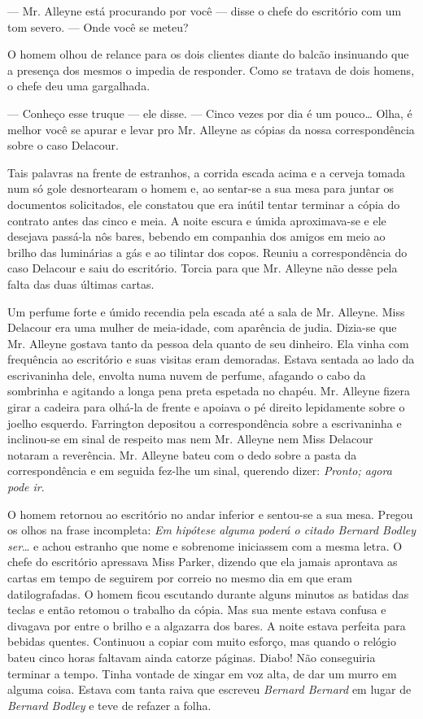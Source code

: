--- Mr. Alleyne está procurando por você --- disse o chefe do
escritório com um tom severo. --- Onde você se meteu?

O homem olhou de relance para os dois clientes diante do
balcão insinuando que a presença dos mesmos o impedia de responder.
Como se tratava de dois homens, o chefe deu uma gargalhada.

--- Conheço esse truque --- ele disse. --- Cinco vezes por dia é um
pouco\ldots{} Olha, é melhor você se apurar e levar pro Mr. Alleyne as
cópias da nossa correspondência sobre o caso Delacour.

Tais palavras na frente de estranhos, a corrida escada acima e a
cerveja tomada num só gole desnortearam o homem e, ao sentar-se a sua
mesa para juntar os documentos solicitados, ele constatou que era
inútil tentar terminar a cópia do contrato antes das cinco e meia. A
noite escura e úmida aproximava-se e ele desejava passá-la nôs bares,
bebendo em companhia dos amigos em meio ao brilho das luminárias a gás
e ao tilintar dos copos. Reuniu a correspondência do caso Delacour e
saiu do escritório. Torcia para que Mr. Alleyne não desse pela falta
das duas últimas cartas.

Um perfume forte e úmido recendia pela escada até a
sala de Mr. Alleyne. Miss Delacour era uma mulher de meia-idade, com
aparência de judia. Dizia-se que Mr. Alleyne gostava tanto da
pessoa dela quanto de seu dinheiro. Ela vinha com frequência
ao escritório e suas visitas eram demoradas. Estava sentada ao
lado da escrivaninha dele, envolta numa nuvem de perfume, afagando
o cabo da sombrinha e agitando a longa pena preta espetada no
chapéu. Mr. Alleyne fizera girar a cadeira para olhá-la de
frente e apoiava o pé direito lepidamente sobre o joelho esquerdo.
Farrington depositou a correspondência sobre a escrivaninha e
inclinou-se em sinal de respeito mas nem Mr. Alleyne nem Miss Delacour
notaram a reverência. Mr. Alleyne bateu com o dedo sobre a
pasta da correspondência e em seguida fez-lhe um sinal, querendo dizer:
\textit{Pronto; agora pode ir}.

O homem retornou ao escritório no andar inferior e sentou-se a sua
mesa. Pregou os olhos na frase incompleta: \textit{Em hipótese alguma poderá o
citado Bernard Bodley ser}\ldots{} e achou estranho que nome e sobrenome
iniciassem com a mesma letra. O chefe do escritório apressava Miss
Parker, dizendo que ela jamais aprontava as cartas em tempo de
seguirem por correio no mesmo dia em que eram datilografadas. O homem
ficou escutando durante alguns minutos as batidas das teclas e
então retomou o trabalho da cópia. Mas sua mente estava confusa e
divagava por entre o brilho e a algazarra dos bares. A noite estava
perfeita para bebidas quentes. Continuou a copiar com muito esforço,
mas quando o relógio bateu cinco horas faltavam ainda catorze páginas.
Diabo! Não conseguiria terminar a tempo. Tinha vontade de xingar em
voz alta, de dar um murro em alguma coisa. Estava com tanta raiva que
escreveu \textit{Bernard Bernard} em lugar de \textit{Bernard Bodley} e teve de refazer
a folha.

